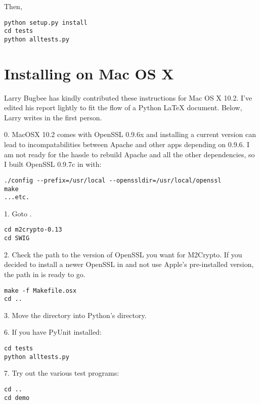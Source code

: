 \documentclass{howto}
\begin{document}
Then,

\begin{verbatim}
python setup.py install
cd tests
python alltests.py
\end{verbatim}

\section{Installing on Mac OS X}

Larry Bugbee has kindly contributed these instructions for Mac OS X 10.2.
I've edited his report lightly to fit the flow of a Python LaTeX document.
Below, Larry writes in the first person.

0. MacOSX 10.2 comes with OpenSSL 0.9.6x and installing a current version
can lead to incompatabilities between Apache and other apps depending on
0.9.6. I am not ready for the hassle to rebuild Apache and all the other
dependencies, so I built OpenSSL 0.9.7c in  with:

\begin{verbatim}
./config --prefix=/usr/local --openssldir=/usr/local/openssl
make
...etc.
\end{verbatim}

1. Goto .

\begin{verbatim}
cd m2crypto-0.13
cd SWIG
\end{verbatim}

2. Check the path to the version of OpenSSL you want for M2Crypto. If you
decided to install a newer OpenSSL in  and not use Apple's
pre-installed version, the path in  is ready to go.

\begin{verbatim}
make -f Makefile.osx
cd ..
\end{verbatim}

3. Move the directory  into Python's 
directory.

6. If you have PyUnit installed:

\begin{verbatim}
cd tests
python alltests.py
\end{verbatim}

7. Try out the various test programs:

\begin{verbatim}
cd ..
cd demo
\end{verbatim}
\end{document}
